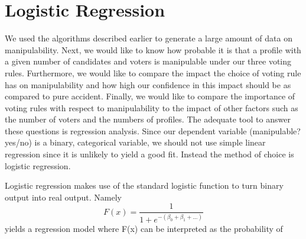 \documentclass[10pt,a4paper]{article}
\begin{document}
	\section{Logistic Regression}
	
	We used the algorithms described earlier to generate a large amount of data on manipulability. Next, we would like to know how probable it is that a profile with a given number of candidates and voters is manipulable under our three voting rules. Furthermore, we would like to compare the impact the choice of voting rule has on manipulability and how high our confidence in this impact should be as compared to pure accident. Finally, we would like to compare the importance of voting rules with respect to manipulability to the impact of other factors such as the number of voters and the numbers of profiles.
	The adequate tool to answer these questions is regression analysis. Since our dependent variable (manipulable? yes/no) is a binary, categorical variable, we should not use simple linear regression since it is unlikely to yield a good fit. Instead the method of choice is logistic regression.
	
	Logistic regression makes use of the standard logistic function to turn binary output into real output. Namely \[F(x)=\frac{1}{1+e^{-(\beta_0+\beta_1+...)}}\] yields a regression model where F(x) can be interpreted as the probability of 
\end{document}
